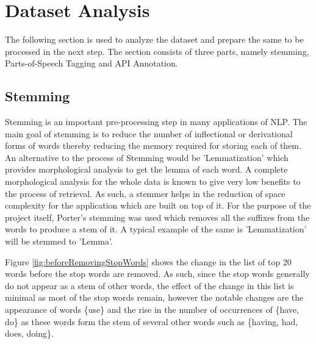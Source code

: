 \documentclass{sig-alternate-05-2015}
\begin{document}
\section{Dataset Analysis}
The following section is used to analyze the dataset and prepare the same to be processed in the next step. The section consists of three parts, namely stemming, Parts-of-Speech Tagging and API Annotation.

\subsection{Stemming}
Stemming is an important pre-processing step in  many applications of NLP. The main goal of stemming is to reduce the number of inflectional or derivational forms of words thereby reducing the memory required for storing each of them. An alternative to the process of Stemming would be 'Lemmatization' which provides morphological analysis to get the lemma of each word. A complete morphological analysis for the whole data is known to give very low benefits to the process of retrieval. As such, a stemmer helps in the reduction of space complexity for the application which are built on top of it. For the purpose of the project itself, Porter's stemming\cite{porter1980algorithm} was used which removes all the suffixes from the words to produce a stem of it. A typical example of the same is 'Lemmatization' will be stemmed to 'Lemma'.

Figure \ref{fig:beforeRemovingStopWords} shows the change in the list of top 20 words before the stop words are removed. As such, since the stop words generally do not appear as a stem of other words, the effect of the change in this list is minimal as most of the stop words remain, however the notable changes are the appearance of words \{use\} and the rise in the number of occurrences of \{have, do\} as these words form the stem of several other words such as \{having, had, does, doing\}.
\end{document}
